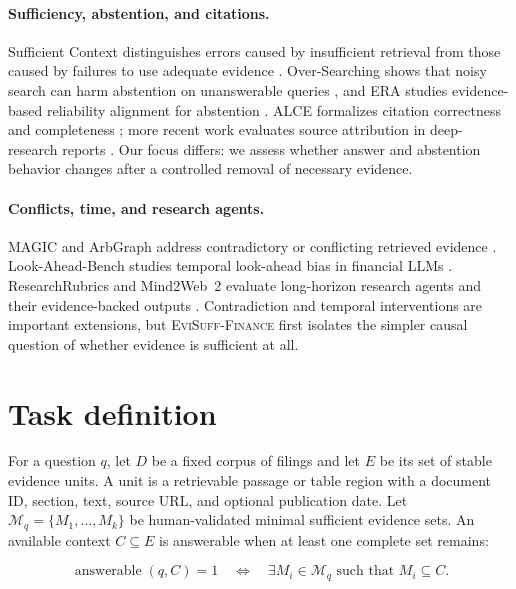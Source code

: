 \documentclass{article}
\newcommand{\benchmark}{\textsc{EviSuff-Finance}}
\begin{document}
\paragraph{Sufficiency, abstention, and citations.}
Sufficient Context distinguishes errors caused by insufficient retrieval from
those caused by failures to use adequate evidence \citep{joren2024sufficient}.
Over-Searching shows that noisy search can harm abstention on unanswerable
queries \citep{xie2026oversearch}, and ERA studies evidence-based reliability
alignment for abstention \citep{shin2026era}. ALCE formalizes citation
correctness and completeness \citep{gao2023alce}; more recent work evaluates
source attribution in deep-research reports \citep{onweller2026cited}. Our
focus differs: we assess whether answer and abstention behavior changes after
a controlled removal of necessary evidence.

\paragraph{Conflicts, time, and research agents.}
MAGIC and ArbGraph address contradictory or conflicting retrieved evidence
\citep{lee2025magic,niu2026arbgraph}. Look-Ahead-Bench studies temporal
look-ahead bias in financial LLMs \citep{benhenda2026lookahead}. ResearchRubrics
and Mind2Web~2 evaluate long-horizon research agents and their evidence-backed
outputs \citep{sharma2025researchrubrics,gou2025mind2web}. Contradiction and
temporal interventions are important extensions, but \benchmark{} first isolates
the simpler causal question of whether evidence is sufficient at all.

\section{Task definition}

For a question $q$, let $D$ be a fixed corpus of filings and let $E$ be its
set of stable evidence units. A unit is a retrievable passage or table region
with a document ID, section, text, source URL, and optional publication date.
Let $\mathcal{M}_q = \{M_1, \ldots, M_k\}$ be human-validated minimal
sufficient evidence sets. An available context $C \subseteq E$ is answerable
when at least one complete set remains:

\begin{equation}
    \operatorname{answerable}(q,C)=1\quad \Longleftrightarrow\quad
    \exists M_i \in \mathcal{M}_q \text{ such that } M_i \subseteq C.
\end{equation}
\end{document}
